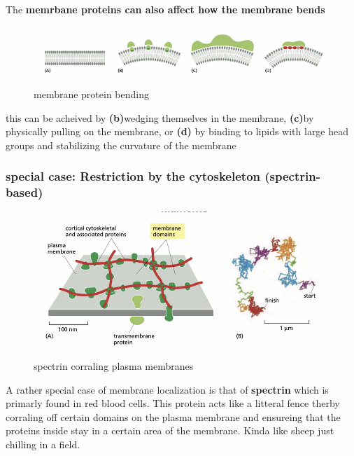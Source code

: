 \documentclass[../main.tex]{subfiles}
\begin{document}
The\textbf{ memrbane proteins can also affect how the membrane bends}

\begin{figure}[H]
    \centering
    \includegraphics[width=\linewidth]{bending.png}
    \caption{membrane protein bending}
    \label{fig:enter-label}
\end{figure}
this can be acheived by  \textbf{(b)}wedging themselves in the membrane, \textbf{(c)}by physically pulling on the membrane, or \textbf{(d)} by binding to lipids with large head groups and stabilizing the curvature of the membrane 


\subsubsection{special case: Restriction by the cytoskeleton (spectrin- based)}

\begin{figure}[H]
    \centering
    \includegraphics[width=\linewidth]{spectrin.png}
    \caption{\gls{spectrin} corraling plasma membranes}
    \label{fig:enter-label}
\end{figure}

A rather special case of membrane localization is that of\textbf{ spectrin} which is primarly found in red blood cells. This protein acts like a litteral fence therby corraling off certain domains on the plasma membrane and ensureing that the proteins inside stay in a certain area of the membrane. Kinda like sheep just chilling in a field.

\printglossaries
\end{document}

